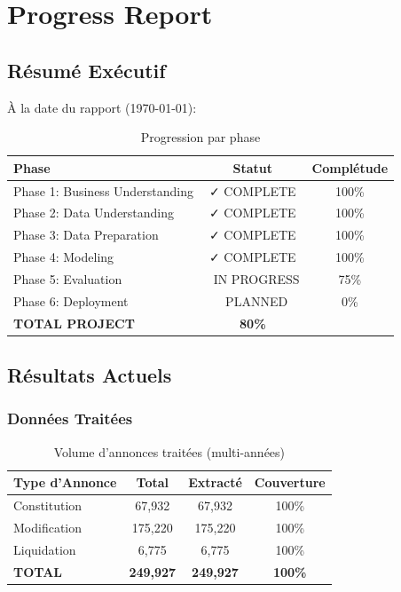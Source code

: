\documentclass[12pt,a4paper]{report}
\begin{document}
\chapter{Progress Report}

\section{Résumé Exécutif}

À la date du rapport (\today):

\begin{table}[H]
\centering
\begin{tabular}{|l|c|c|}
\hline
\textbf{Phase} & \textbf{Statut} & \textbf{Complétude} \\
\hline
Phase 1: Business Understanding & ✓ COMPLETE & 100\% \\
Phase 2: Data Understanding & ✓ COMPLETE & 100\% \\
Phase 3: Data Preparation & ✓ COMPLETE & 100\% \\
Phase 4: Modeling & ✓ COMPLETE & 100\% \\
Phase 5: Evaluation & 🔄 IN PROGRESS & 75\% \\
Phase 6: Deployment & 📅 PLANNED & 0\% \\
\hline
\textbf{TOTAL PROJECT} & \textbf{80\%} & \\
\hline
\end{tabular}
\caption{Progression par phase}
\end{table}

\section{Résultats Actuels}

\subsection{Données Traitées}

\begin{table}[H]
\centering
\begin{tabular}{|l|c|c|c|}
\hline
\textbf{Type d'Annonce} & \textbf{Total} & \textbf{Extracté} & \textbf{Couverture} \\
\hline
Constitution & 67,932 & 67,932 & 100\% \\
Modification & 175,220 & 175,220 & 100\% \\
Liquidation & 6,775 & 6,775 & 100\% \\
\hline
\textbf{TOTAL} & \textbf{249,927} & \textbf{249,927} & \textbf{100\%} \\
\hline
\end{tabular}
\caption{Volume d'annonces traitées (multi-années)}
\end{table}
\end{document}
